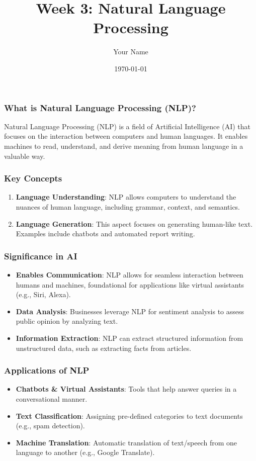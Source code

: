 \documentclass{beamer}
\title{Week 3: Natural Language Processing}
\author{Your Name}
\institute{Your Institution}
\date{\today}
\begin{document}
\frame{\titlepage}

\begin{frame}[fragile]
    \titlepage
\end{frame}

\begin{frame}[fragile]
    \frametitle{What is Natural Language Processing (NLP)?}
    
    Natural Language Processing (NLP) is a field of Artificial Intelligence (AI) that focuses on the interaction between computers and human languages.
    It enables machines to read, understand, and derive meaning from human language in a valuable way.
\end{frame}

\begin{frame}[fragile]
    \frametitle{Key Concepts}
    
    \begin{enumerate}
        \item \textbf{Language Understanding}: NLP allows computers to understand the nuances of human language, including grammar, context, and semantics.
        \item \textbf{Language Generation}: This aspect focuses on generating human-like text. Examples include chatbots and automated report writing.
    \end{enumerate}
\end{frame}

\begin{frame}[fragile]
    \frametitle{Significance in AI}
    
    \begin{itemize}
        \item \textbf{Enables Communication}: NLP allows for seamless interaction between humans and machines, foundational for applications like virtual assistants (e.g., Siri, Alexa).
        \item \textbf{Data Analysis}: Businesses leverage NLP for sentiment analysis to assess public opinion by analyzing text.
        \item \textbf{Information Extraction}: NLP can extract structured information from unstructured data, such as extracting facts from articles.
    \end{itemize}
\end{frame}

\begin{frame}[fragile]
    \frametitle{Applications of NLP}
    
    \begin{itemize}
        \item \textbf{Chatbots \& Virtual Assistants}: Tools that help answer queries in a conversational manner.
        \item \textbf{Text Classification}: Assigning pre-defined categories to text documents (e.g., spam detection).
        \item \textbf{Machine Translation}: Automatic translation of text/speech from one language to another (e.g., Google Translate).
    \end{itemize}
\end{frame}
\end{document}
